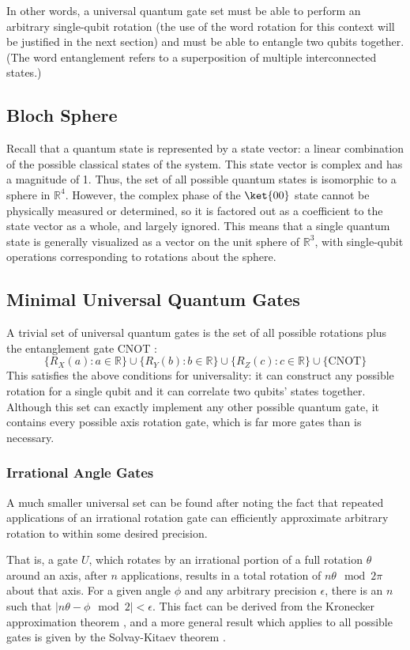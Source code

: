 \documentclass[12pt]{article}
\begin{document}
In other words, a universal quantum gate set must be able to perform an arbitrary single-qubit rotation (the use of the word rotation for this context will be justified in the next section) and must be able to entangle two qubits together. (The word entanglement refers to a superposition of multiple interconnected states.)

\subsection{Bloch Sphere}
Recall that a quantum state is represented by a state vector: a linear combination of the possible classical states of the system. This state vector is complex and has a magnitude of 1. Thus, the set of all possible quantum states is isomorphic to a sphere in $\mathbb{R}^4$. However, the complex phase of the  $\ket{00}$ state cannot be physically measured or determined, so it is factored out as a coefficient to the state vector as a whole, and largely ignored. This means that a single quantum state is generally visualized as a vector on the unit sphere of $\mathbb{R}^3$, with single-qubit operations corresponding to rotations about the sphere.

\subsection{Minimal Universal Quantum Gates}
A trivial set of universal quantum gates is the set of all possible rotations plus the entanglement gate CNOT \cite{Boykin2000}:
$$\{R_X(a) : a \in \mathbb{R}\} \cup \{R_Y(b) : b \in \mathbb{R}\} \cup \{R_Z(c) : c \in \mathbb{R}\} \cup \{\text{CNOT}\}$$
This satisfies the above conditions for universality: it can construct any possible rotation for a single qubit and it can correlate two qubits' states together. Although this set can exactly implement any other possible quantum gate, it contains every possible axis rotation gate, which is far more gates than is necessary.

\subsubsection{Irrational Angle Gates}
A much smaller universal set can be found after noting the fact that repeated applications of an irrational rotation gate can efficiently approximate arbitrary rotation to within some desired precision.

That is, a gate $U$, which rotates by an irrational portion of a full rotation $\theta$ around an axis, after $n$ applications, results in a total rotation of $n \theta \mod 2 \pi$ about that axis. For a given angle $\phi$ and any arbitrary precision $\epsilon$, there is an $n$ such that $|n \theta - \phi \mod 2| < \epsilon$. This fact can be derived from the Kronecker approximation theorem \cite{Hlawka1986}, and a more general result which applies to all possible gates is given by the Solvay-Kitaev theorem \cite{Dawson2005}.
\end{document}
